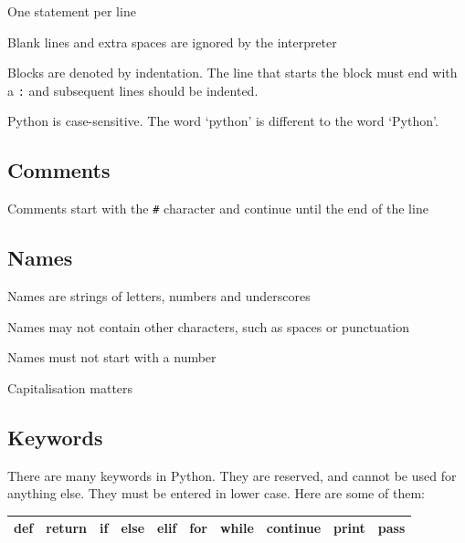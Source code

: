 \documentclass[12pt,a4paper,twoside]{article}
\renewcommand{\_}{\texttt{\symbol{95}}}
\begin{document}
\begin{bulletlist}
\item One statement per line
\item Blank lines and extra spaces are ignored by the interpreter
\item Blocks are denoted by indentation. The line that starts the block must
    end with a \verb^:^ and subsequent lines should be indented.
\item Python is case-sensitive. The word `python' is different to the word `Python'.
\end{bulletlist}

\subsection{Comments}

\begin{bulletlist}
\item Comments start with the \verb^#^ character and continue until the end
      of the line
\end{bulletlist}


\subsection{Names}

\begin{bulletlist}
\item Names are strings of letters, numbers and underscores
\item Names may not contain other characters, such as spaces or punctuation
\item Names must not start with a number
\item Capitalisation matters
\end{bulletlist}

\subsection{Keywords}

There are many keywords in Python. They are reserved, and cannot be used for anything else. They must be entered in lower case. Here are some of them:

{\bfseries \ttfamily
\begin{tabular}{|llllllllll|}
\hline
def & return & if & else & elif & for & while & continue & print & pass\\
\hline
\end{tabular}
}
\end{document}
